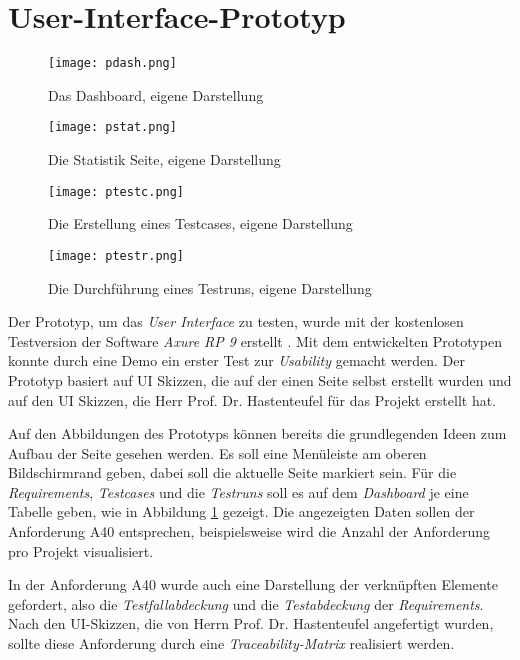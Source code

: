 \documentclass[11pt,a4paper]{report}
\begin{document}
\section{User-Interface-Prototyp} 
\label{s:ui}

\begin{figure}[htpb]
  \centering
  \texttt{[image: pdash.png]}
  \caption{Das Dashboard, eigene Darstellung}
  \label{f:pdash}
\end{figure}


\begin{figure}[htpb]
  \centering
  \texttt{[image: pstat.png]}
  \caption{Die Statistik Seite, eigene Darstellung}
  \label{f:pstat}
\end{figure}



\begin{figure}[htpb]
  \centering
  \texttt{[image: ptestc.png]}
  \caption{Die Erstellung eines Testcases, eigene Darstellung}
  \label{f:ptestc}
\end{figure}


\begin{figure}[htpb]
  \centering
  \texttt{[image: ptestr.png]}
  \caption{Die Durchführung eines Testruns, eigene Darstellung}
  \label{f:ptestr}
\end{figure}


Der Prototyp, um das \textit{User Interface} zu testen, wurde mit der kostenlosen Testversion der Software \textit{Axure RP 9} erstellt \cite{axure}. Mit dem entwickelten Prototypen konnte durch eine Demo ein erster Test zur \textit{Usability} gemacht werden. Der Prototyp basiert auf UI Skizzen, die auf der einen Seite selbst erstellt wurden und auf den UI Skizzen, die Herr Prof. Dr. Hastenteufel für das Projekt erstellt hat.

Auf den Abbildungen des Prototyps können bereits die grundlegenden Ideen zum Aufbau der Seite gesehen werden. Es soll eine Menüleiste am oberen Bildschirmrand geben, dabei soll die aktuelle Seite markiert sein. Für die \textit{Requirements}, \textit{Testcases} und die \textit{Testruns} soll es auf dem \textit{Dashboard} je eine Tabelle geben, wie in Abbildung \ref{f:pdash} gezeigt. Die angezeigten Daten sollen der Anforderung A40 entsprechen, beispielsweise wird die Anzahl der Anforderung pro Projekt visualisiert.

In der Anforderung A40 wurde auch eine Darstellung der verknüpften Elemente gefordert, also die \textit{Testfallabdeckung} und die \textit{Testabdeckung} der \textit{Requirements}. Nach den UI-Skizzen, die von Herrn Prof. Dr. Hastenteufel angefertigt wurden, sollte diese Anforderung durch eine \textit{Traceability-Matrix} realisiert werden.
\end{document}
